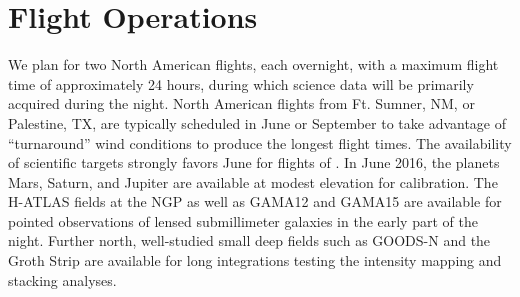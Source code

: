 \section{Flight Operations}
\label{sec:FlightOperations}

We plan for two North American flights, each overnight, with a maximum flight time of approximately 24 hours, during which science data will be primarily acquired during the night.  North American flights from Ft. Sumner, NM, or Palestine, TX, are typically scheduled in June or September to take advantage of ``turnaround'' wind conditions to produce the longest flight times.  The availability of scientific targets strongly favors June for flights of \name. In June 2016, the planets Mars, Saturn, and Jupiter are available at modest elevation for calibration.  The H-ATLAS fields at the NGP as well as GAMA12 and GAMA15 are available for pointed observations of lensed submillimeter galaxies in the early part of the night.  Further north, well-studied small deep fields such as GOODS-N and the Groth Strip are available for long integrations testing the intensity mapping and stacking analyses.



